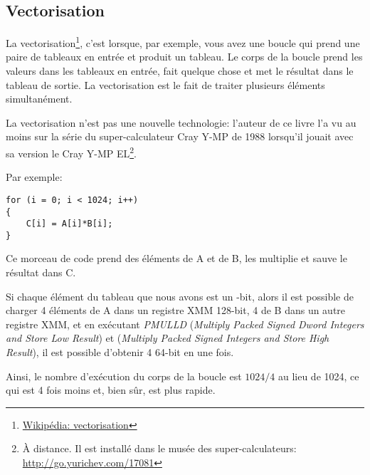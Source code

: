 ﻿\subsection{Vectorisation}

\newcommand{\URLVEC}{\href{http://go.yurichev.com/17080}{Wikipédia: vectorisation}}

La vectorisation\footnote{\URLVEC}, c'est lorsque, par exemple, vous avez une boucle
qui prend une paire de tableaux en entrée et produit un tableau.
Le corps de la boucle prend les valeurs dans les tableaux en entrée, fait quelque
chose et met le résultat dans le tableau de sortie.
La vectorisation est le fait de traiter plusieurs éléments simultanément.

La vectorisation n'est pas une nouvelle technologie: l'auteur de ce livre l'a vu
au moins sur la série du super-calculateur Cray Y-MP de 1988 lorsqu'il jouait avec
sa version  le Cray Y-MP EL\footnote{À distance. Il est installé dans le
musée des super-calculateurs: \url{http://go.yurichev.com/17081}}.

Par exemple:

\begin{lstlisting}[style=customc]
for (i = 0; i < 1024; i++)
{
    C[i] = A[i]*B[i];
}
\end{lstlisting}

Ce morceau de code prend des éléments de A et de B, les multiplie et sauve le résultat
dans C.

\newcommand{\PMULLD}{\emph{PMULLD} (\emph{Multiply Packed Signed Dword Integers and Store Low Result})}
\newcommand{\PMULHW}{\TT{PMULHW} (\emph{Multiply Packed Signed Integers and Store High Result})}

Si chaque élément du tableau que nous avons est un -bit, alors il est possible
de charger 4 éléments de A dans un registre XMM 128-bit, 4 de B dans un autre registre
XMM, et en exécutant \PMULLD{} et \PMULHW{}, il est possible d'obtenir 4 
64-bit en une fois.

Ainsi, le nombre d'exécution du corps de la boucle est $1024/4$ au lieu de 1024,
ce qui est 4 fois moins et, bien sûr, est plus rapide.

\newcommand{\URLINTELVEC}{\href{http://go.yurichev.com/17082}{Extrait: Vectorisation automatique efficace}}

